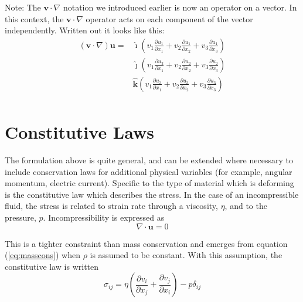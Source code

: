 \documentclass[10pt]{article}
\begin{document}
	Note: The $\mathbf{v} \cdot \nabla$ notation we introduced earlier is 
	now an operator on a vector. In this context, the $\mathbf{v} \cdot \nabla$ 
	operator acts on each component of the vector independently. Written out
	it looks like this:
	 		\begin{equation}
	 			\begin{split}
					(\mathbf{v} \cdot \nabla) \mathbf{u} = 
						& \hat{\boldsymbol{\imath}} \left( v_1 \frac{\partial u_1}{\partial x_1} + 
						v_2 \frac{\partial u_1}{\partial x_2} + v_3 \frac{\partial u_1}{\partial x_3} \right) \\
							& \hat{\boldsymbol{\jmath}} \left( v_1 \frac{\partial u_2}{\partial x_1} + 
						v_2 \frac{\partial u_2}{\partial x_2} + v_3 \frac{\partial u_2}{\partial x_3} \right) \\
							& \hat{\boldsymbol{k}} \left( v_1 \frac{\partial u_3}{\partial x_1} + 
						v_2 \frac{\partial u_3}{\partial x_2} + v_3 \frac{\partial u_3}{\partial x_3} \right) \\				
				\end{split}	
		\end{equation}
	 

\section{Constitutive Laws}
	
	The formulation above is quite general, and can be extended where necessary to include 
	conservation laws for additional physical variables (for example, angular momentum, electric current).
	Specific to the type of material which is deforming is the constitutive law which 
	describes the stress. In the case of an incompressible fluid, the stress is related to strain rate through
	a viscosity, $\eta$, and to the pressure, $p$. Incompressibility
	is expressed as	
		\begin{equation}
			\nabla \cdot \mathbf{u} = 0	
		\end{equation}
	
	This is a tighter constraint than mass conservation and emerges from 
	equation (\ref{eq:masscons}) when $\rho$ is 
	assumed to be constant. With this assumption, the constitutive law is written
		\begin{equation}
			\sigma_{ij} = \eta \left( \frac{\partial v_i}{\partial x_j} + \frac{\partial v_j}{\partial x_i}\right) - p\delta_{ij}
		\end{equation}
	
\end{document}
